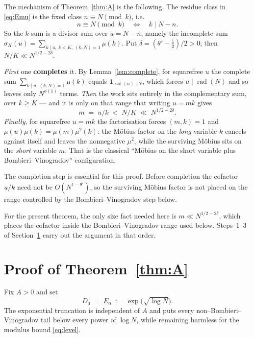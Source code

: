\documentclass[11pt,a4paper]{article}
\theoremstyle{plain}
\theoremstyle{definition}
\theoremstyle{remark}
\DeclareMathOperator{\rad}{rad}
\begin{document}
The mechanism of Theorem~\ref{thm:A} is the following. The residue
class in \eqref{eq:Emu} is the fixed class $n\equiv N\pmod k$, i.e.
\[
  n\equiv N\pmod{k}\quad\Longleftrightarrow\quad k\mid N-n .
\]
So the $k$-sum is a divisor sum over $u=N-n$, namely the incomplete
sum $\sigma_K(u)=\sum_{k\mid u,\ k<K,\ (k,N)=1}\mu(k)$.  Put
$\delta=(\theta'-\tfrac12)/2>0$; then
$N/K\ll N^{1/2-2\delta}$.

\emph{First} one \textbf{completes} it. By Lemma~\ref{lem:complete},
for squarefree $u$ the complete sum
$\sum_{k\mid u,\,(k,N)=1}\mu(k)$ equals $\mathbf 1_{\rad(u)\mid N}$,
which forces $u\mid\rad(N)$ and so leaves only $N^{o(1)}$ terms.
\emph{Then} the work sits entirely in the complementary sum, over
$k\ge K$ --- and it is only on that range that writing $u=mk$ gives
\[
  m\;=\;u/k\;<\;N/K\;\ll\;N^{1/2-2\delta}.
\]
\emph{Finally}, for squarefree $u=mk$ the factorisation forces
$(m,k)=1$ and $\mu(u)\mu(k)=\mu(m)\mu^2(k)$: the M\"obius factor on
the \emph{long} variable $k$ cancels against itself and leaves the
nonnegative $\mu^2$, while the surviving M\"obius sits on the
\emph{short} variable $m$. That is the classical ``M\"obius on the
short variable plus Bombieri--Vinogradov'' configuration.

The completion step is essential for this proof.  Before completion the
cofactor $u/k$ need not be $O(N^{1-\theta'})$, so the surviving
M\"obius factor is not placed on the range controlled by the
Bombieri--Vinogradov step below.

For the present theorem, the only size fact needed here is
$m\ll N^{1/2-2\delta}$, which places the cofactor inside the
Bombieri--Vinogradov range used below. Steps~1--3 of
Section~\ref{sec:proof} carry out the argument in that order.



\section{Proof of \texorpdfstring{Theorem~\ref{thm:A}}{the first theorem}}
\label{sec:proof}

Fix $A>0$ and set
\begin{equation}\label{eq:trunc}
  D_0\;=\;E_0\;:=\;\exp\bigl(\sqrt{\log N}\bigr).
\end{equation}
The exponential truncation is independent of $A$ and puts every
non--Bombieri--Vinogradov tail below every power of $\log N$, while
remaining harmless for the modulus bound \eqref{eq:level}.
\end{document}
